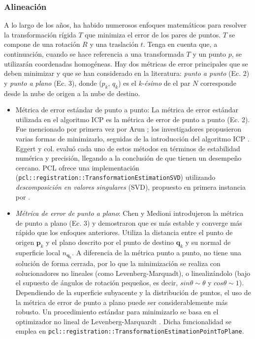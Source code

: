 \subsubsection{Alineación}
A lo largo de los años, ha habido numerosos enfoques matemáticos para resolver la transformación rígida $T$ que minimiza el error de los pares de puntos. $T$ se compone de una rotación $R$ y una traslación $t$. Tenga en cuenta que, a continuación, cuando se hace referencia a una transformada $T$ y un punto $p$, se utilizarán coordenadas homogéneas. Hay dos métricas de error principales que se deben minimizar y que se han considerado en la literatura: \textit{punto a punto} (Ec. 2) y \textit{punto a plano} (Ec. 3), donde ($p_k$, $q_k$) es el \textit{k-ésimo} de el par $N$ corresponde desde la nube de origen a la nube de destino.
\begin{itemize}
    \item Métrica de error estándar de punto a punto: La métrica de error estándar utilizada en el algoritmo ICP es la métrica de error de punto a punto (Ec. 2). Fue mencionado por primera vez por Arun \cite{arun1987}; los investigadores propusieron varias formas de minimizarlo, seguidas de la introducción del algoritmo ICP \cite{besl1992}. Eggert y col. \cite{eggert1997} evaluó cada uno de estos métodos en términos de estabilidad numérica y precisión, llegando a la conclusión de que tienen un desempeño cercano. PCL ofrece una implementación (\lstinline{pcl::registration::TransformationEstimationSVD}) utilizando \textit{descomposición en valores singulares} (SVD), propuesto en primera instancia por \cite{horn1987}.
    \item \textit{Métrica de error de punto a plano}: Chen y Medioni \cite{chen1992} introdujeron la métrica de punto a plano (Ec. 3) y demostraron que es más estable y converge más rápido que los enfoques anteriores. Utiliza la distancia entre el punto de origen $\bm{p}_k$ y el plano descrito por el punto de destino $\bm{q}_k$ y su normal de superficie local $n_{\bm{q}_k}$. A diferencia de la métrica punto a punto, no tiene una solución de forma cerrada, por lo que la minimización se realiza con solucionadores no lineales (como Levenberg-Marquadt), o linealizándolo \cite{low2004} (bajo el supuesto de ángulos de rotación pequeños, es decir, $sin \theta \sim \theta$ y $cos \theta \sim 1$). Dependiendo de la superficie subyacente y la distribución de puntos, el uso de la métrica de error de punto a plano puede ser considerablemente más robusto. Un procedimiento estándar para minimizarlo se basa en el optimizador no lineal de Levenberg-Marquardt \cite{fitzgibbon2001}. Dicha funcionalidad se emplea en \lstinline{pcl::registration::TransformationEstimationPointToPlane}.

\end{itemize}

